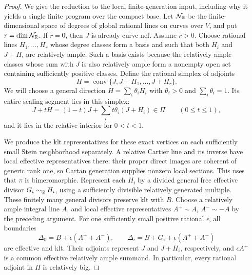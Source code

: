 \begin{proof}
We give the reduction to the local finite-generation input, including why
it yields a single finite program over the compact base. Let
\(\mathcal N_{\mathbb R}\) be the finite-dimensional space of degrees of global
rational lines on curves over \(V\), and put \(r=\dim\mathcal N_{\mathbb R}\).
If \(r=0\), then \(J\) is already curve-nef. Assume \(r>0\). Choose
rational lines \(H_1,\ldots,H_r\) whose degree classes form a basis and
such that both \(H_i\) and \(J+H_i\) are relatively ample. Such a basis
exists because the relatively ample classes whose sum with \(J\) is also
relatively ample form a nonempty open set containing sufficiently positive
classes. Define the rational simplex of adjoints
\[
 \Pi=\operatorname{conv}\{J,J+H_1,\ldots,J+H_r\}.
\]
We will choose a general direction \(H=\sum_i\theta_iH_i\) with
\(\theta_i>0\) and \(\sum_i\theta_i=1\). Its entire scaling segment lies
in this simplex:
\[
 J+tH=(1-t)J+\sum_i t\theta_i(J+H_i)\in\Pi
 \qquad(0\leq t\leq1),
\]
and it lies in the relative interior for \(0<t<1\).

We produce the klt representatives for these exact vertices on each
sufficiently small Stein neighborhood separately. A relative Cartier line
and its inverse have local effective representatives there: their proper
direct images are coherent of generic rank one, so Cartan generation
supplies nonzero local sections. This uses that \(\pi\) is bimeromorphic.
Represent each \(H_i\) by a divided general free effective divisor
\(G_i\sim_{\mathbb Q}H_i\), using a sufficiently divisible relatively generated
multiple. These finitely many general divisors preserve klt with \(B\).
Choose a relatively ample integral line \(A\), and local effective
representatives \(A^+\sim A\), \(A^-\sim -A\) by the preceding argument.
For one sufficiently small positive rational \(\epsilon\), all boundaries
\[
 \Delta_0=B+\epsilon(A^++A^-),\qquad
 \Delta_i=B+G_i+\epsilon(A^++A^-)
\]
are effective and klt. Their adjoints represent \(J\) and \(J+H_i\),
respectively, and \(\epsilon A^+\) is a common effective relatively ample
summand. In particular, every rational adjoint in \(\Pi\) is relatively big.


\end{proof}
